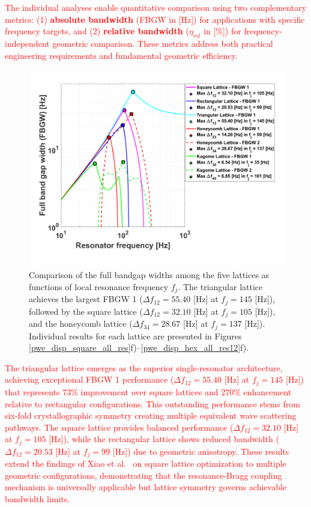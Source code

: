\documentclass[review,numbers,sort&compress]{elsarticle}
\begin{document}
\textcolor{red}{The individual analyses enable quantitative comparison using two complementary metrics: (1) \textbf{absolute bandwidth} (FBGW in [Hz]) for applications with specific frequency targets, and (2) \textbf{relative bandwidth} ($\eta_{rel}$ in [\%]) for frequency-independent geometric comparison. These metrics address both practical engineering requirements and fundamental geometric efficiency.}
\newpage
\begin{figure}[htb]  
	\centering  
	\includegraphics[width=1\textwidth]{0_disp_comp_lattices.pdf}
	\caption{Comparison of the full bandgap widths among the five lattices as functions of local resonance frequency $f_j$. The triangular lattice achieves the largest FBGW 1 ($\Delta f_{12} = 55.40$ [Hz] at $f_j = 145$ [Hz]), followed by the square lattice ($\Delta f_{12} = 32.10$ [Hz] at $f_j = 105$ [Hz]), and the honeycomb lattice ($\Delta f_{34} = 28.67$ [Hz] at $f_j = 137$ [Hz]). Individual results for each lattice are presented in Figures \ref{pwe_disp_square_all_res}f)--\ref{pwe_disp_hex_all_res12}f).}  
	\label{comp_all_latices_FBGW 1}  
\end{figure}  

\textcolor{red}{The triangular lattice emerges as the superior single-resonator architecture, achieving exceptional FBGW 1 performance ($\Delta f_{12} = 55.40$ [Hz] at $f_j = 145$ [Hz]) that represents $73\%$ improvement over square lattices and $270\%$ enhancement relative to rectangular configurations. This outstanding performance stems from six-fold crystallographic symmetry creating multiple equivalent wave scattering pathways. The square lattice provides balanced performance ($\Delta f_{12} = 32.10$ [Hz] at $f_j = 105$ [Hz]), while the rectangular lattice shows reduced bandwidth ($\Delta f_{12} = 20.53$ [Hz] at $f_j = 99$ [Hz]) due to geometric anisotropy. These results extend the findings of Xiao et al.~\cite{Xiao_2012} on square lattice optimization to multiple geometric configurations, demonstrating that the resonance-Bragg coupling mechanism is universally applicable but lattice symmetry governs achievable bandwidth limits.}
\end{document}
